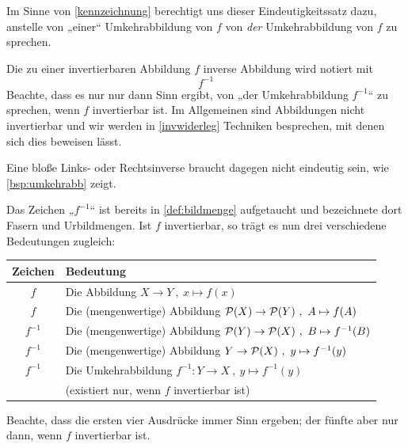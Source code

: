 \begin{bem} \label{dieumkehrabb}
    Im Sinne von \cref{kennzeichnung} berechtigt uns dieser Eindeutigkeitssatz dazu, anstelle von „einer“ Umkehrabbildung von $f$ von \emph{der} Umkehrabbildung von $f$ zu sprechen.
    
    Die zu einer invertierbaren Abbildung $f$ inverse Abbildung wird notiert mit
        \[ f^{-1} \]
    Beachte, dass es nur nur dann Sinn ergibt, von „der Umkehrabbildung $f^{-1}$“ zu sprechen, wenn $f$ invertierbar ist. Im Allgemeinen sind Abbildungen nicht invertierbar und wir werden in \cref{invwiderleg} Techniken besprechen, mit denen sich dies beweisen lässt.

    Eine bloße Links- oder Rechtsinverse braucht dagegen nicht eindeutig sein, wie \cref{bsp:umkehrabb} zeigt.
\end{bem}


\begin{bem}
    Das Zeichen „$f^{-1}$“ ist bereits in \cref{def:bildmenge} aufgetaucht und bezeichnete dort Fasern und Urbildmengen. Ist $f$ invertierbar, so trägt es nun drei verschiedene Bedeutungen zugleich:
    \begin{center}
    \begin{tabular}{cl}
        Zeichen & Bedeutung \\
        \midrule
        $f$ & Die Abbildung $X \to Y \ ,\ x \mapsto f(x)$ \\
        $f$ & Die (mengenwertige) Abbildung $\mathcal P(X) \to \mathcal P(Y) \ ,\ A\mapsto f(A)$  \\
        $f^{-1}$ & Die (mengenwertige) Abbildung $\mathcal P(Y) \to \mathcal P(X) \ ,\ B\mapsto f^{-1}(B)$ \\
        $f^{-1}$ & Die (mengenwertige) Abbildung $Y \to \mathcal P(X) \ ,\ y\mapsto f^{-1}(y)$ \\
        \midrule
        $f^{-1}$ & Die Umkehrabbildung $f^{-1} : Y\to X \ ,\ y \mapsto f^{-1}(y)$ \\
        & (existiert nur, wenn $f$ invertierbar ist)
    \end{tabular}
    \end{center}
    Beachte, dass die ersten vier Ausdrücke immer Sinn ergeben; der fünfte aber nur dann, wenn $f$ invertierbar ist.
\end{bem}


